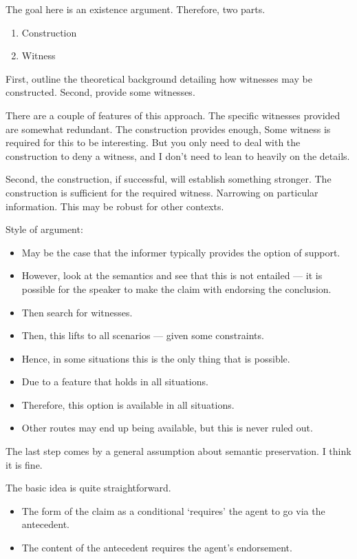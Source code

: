 \documentclass[10pt]{article}
\begin{document}
\newpage

\begin{note}
  The goal here is an existence argument.
  Therefore, two parts.
  \begin{enumerate}
  \item Construction
  \item Witness
  \end{enumerate}
  First, outline the theoretical background detailing how witnesses may be constructed.
  Second, provide some witnesses.

  There are a couple of features of this approach.
  The specific witnesses provided are somewhat redundant.
  The construction provides enough,
  Some witness is required for this to be interesting.
  But you only need to deal with the construction to deny a witness, and I don't need to lean to heavily on the details.

  Second, the construction, if successful, will establish something stronger.
  The construction is sufficient for the required witness.
  Narrowing on particular information.
  This may be robust for other contexts.

  Style of argument:
  \begin{itemize}
  \item May be the case that the informer typically provides the option of support.
  \item However, look at the semantics and see that this is not entailed --- it is possible for the speaker to make the claim with endorsing the conclusion.
  \item Then search for witnesses.
  \item Then, this lifts to all scenarios --- given some constraints.
  \item Hence, in some situations this is the only thing that is possible.
  \item Due to a feature that holds in all situations.
  \item Therefore, this option is available in all situations.
  \item Other routes may end up being available, but this is never ruled out.
  \end{itemize}
  The last step comes by a general assumption about semantic preservation.
  I think it is fine.
\end{note}

\begin{note}
  The basic idea is quite straightforward.
  \begin{itemize}
  \item The form of the claim as a conditional `requires' the agent to go via the antecedent.
  \item The content of the antecedent requires the agent's endorsement.
  \end{itemize}
\end{note}
\end{document}
